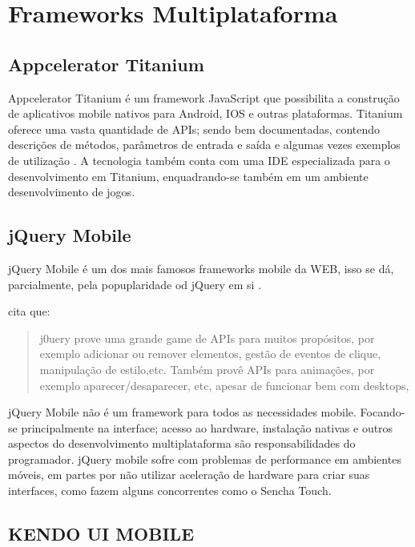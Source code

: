 \section{Frameworks Multiplataforma}

\subsection{Appcelerator Titanium}

Appcelerator Titanium é um framework JavaScript que possibilita a
construção de aplicativos mobile nativos para Android, IOS e outras
plataformas. Titanium oferece uma vasta quantidade de APIs; sendo
bem documentadas, contendo descrições de métodos, parâmetros de
entrada e saída e algumas vezes exemplos de utilização \autocite[pp.
2]{crossPlatformAppsAnimations}. A tecnologia também conta com uma IDE
especializada para o desenvolvimento em Titanium, enquadrando-se também
em um ambiente desenvolvimento de jogos.

\subsection{jQuery Mobile}

jQuery Mobile é um dos mais famosos frameworks mobile da WEB, isso se
dá, parcialmente, pela popuplaridade od jQuery em si \autocite[pp.
14]{viabilityBusinessApplications}.

\autocite[pp. 2]{crossPlatformAppsAnimations} cita que:
\begin{quote}
j0uery prove uma grande game de APIs para muitos propósitos, por
exemplo adicionar ou remover elementos, gestão de eventos de clique,
manipulação de estilo,etc. Também provê APIs para animações, por
exemplo aparecer/desaparecer, etc, apesar de funcionar bem com desktops,
\end{quote}

jQuery Mobile não é um framework para todos as necessidades mobile.
Focando-se principalmente na interface; acesso ao hardware, instalação
nativas e outros aspectos do desenvolvimento multiplataforma
são responsabilidades do programador. jQuery mobile sofre com
problemas de performance em ambientes móveis, em partes por não
utilizar aceleração de hardware para criar suas interfaces,
como fazem alguns concorrentes como o Sencha Touch\autocite[pp.
14]{viabilityBusinessApplications}.

\subsection{KENDO UI MOBILE}

